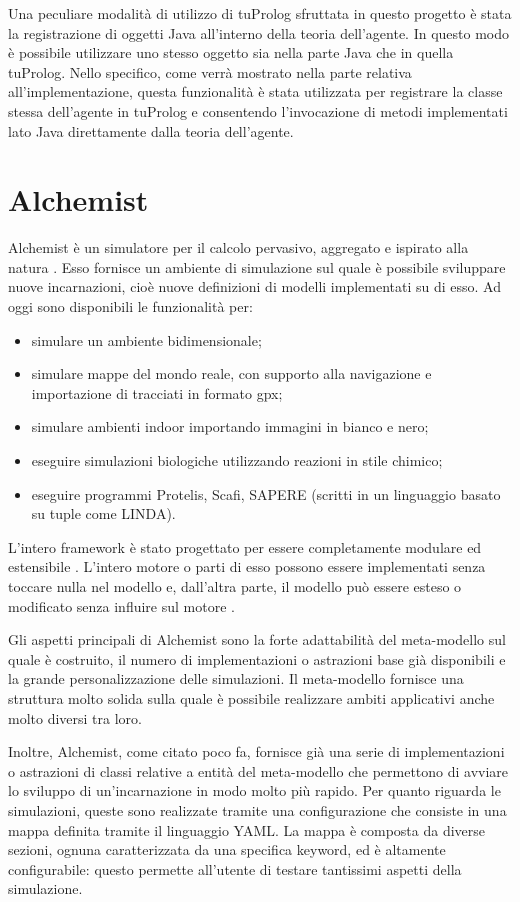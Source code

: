 Una peculiare modalità di utilizzo di tuProlog sfruttata in questo progetto è stata la registrazione di oggetti Java all'interno della teoria dell'agente. In questo modo è possibile utilizzare uno stesso oggetto sia nella parte Java che in quella tuProlog. Nello specifico, come verrà mostrato nella parte relativa all'implementazione, questa funzionalità è stata utilizzata per registrare la classe stessa dell'agente in tuProlog e consentendo l'invocazione di metodi implementati lato Java direttamente dalla teoria dell'agente.

\section{Alchemist}
Alchemist è un simulatore per il calcolo pervasivo, aggregato e ispirato alla natura \cite{Alchemist}. Esso fornisce un ambiente di simulazione sul quale è possibile sviluppare nuove incarnazioni, cioè nuove definizioni di modelli implementati su di esso. Ad oggi sono disponibili le funzionalità per:
\begin{itemize}
\item simulare un ambiente bidimensionale;
\item simulare mappe del mondo reale, con supporto alla navigazione e importazione di tracciati in formato gpx;
\item simulare ambienti indoor importando immagini in bianco e nero;
\item eseguire simulazioni biologiche utilizzando reazioni in stile chimico;
\item eseguire programmi Protelis, Scafi, SAPERE (scritti in un linguaggio basato su tuple come LINDA).
\end{itemize}

L'intero framework è stato progettato per essere completamente modulare ed estensibile \cite{alchemist-jos2013}.
L'intero motore o parti di esso possono essere implementati senza toccare nulla nel modello e, dall'altra parte, il modello può essere esteso o modificato senza influire sul motore \cite{alchemist-jos2013}.

Gli aspetti principali di Alchemist sono la forte adattabilità del meta-modello sul quale è costruito, il numero di implementazioni o astrazioni base già disponibili e la grande personalizzazione delle simulazioni.
Il meta-modello fornisce una struttura molto solida sulla quale è possibile realizzare ambiti applicativi anche molto diversi tra loro.

Inoltre, Alchemist, come citato poco fa, fornisce già una serie di implementazioni o astrazioni di classi relative a entità del meta-modello che permettono di avviare lo sviluppo di un'incarnazione in modo molto più rapido.
Per quanto riguarda le simulazioni, queste sono realizzate tramite una configurazione che consiste in una mappa definita tramite il linguaggio YAML. La mappa è composta da diverse sezioni, ognuna caratterizzata da una specifica keyword, ed è altamente configurabile: questo permette all'utente di testare tantissimi aspetti della simulazione.


